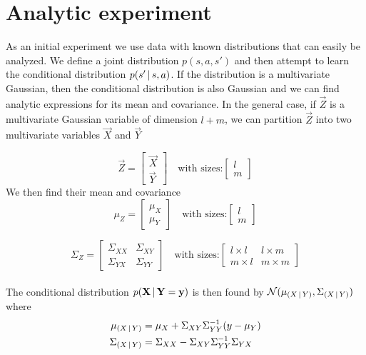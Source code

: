 \section{Analytic experiment}
\label{exp:analytic}
As an initial experiment we use data with known distributions that can easily be analyzed. We define a joint distribution $p(s,a,s')$ and then attempt to learn the conditional distribution $p\given{s'}{s,a}$. If the distribution is a multivariate Gaussian, then the conditional distribution is also Gaussian and we can find analytic expressions for its mean and covariance. In the general case, if $\vec{Z}$ is a multivariate Gaussian variable of dimension $l+m$, we can partition $\vec{Z}$ into two multivariate variables $\vec{X}$ and $\vec{Y}$

\begin{equation}
\vec{Z} = 
\begin{bmatrix}
\vec{X} \\
\vec{Y}
\end{bmatrix}
\quad
\text{with sizes:} 
\begin{bmatrix}
l \\
m
\end{bmatrix}
\end{equation}
We then find their mean and covariance
\begin{equation}
\mu_{Z} = 
\begin{bmatrix}
\mu_{X} \\
\mu_{Y}
\end{bmatrix}
\quad
\text{with sizes:} 
\begin{bmatrix}
l \\
m
\end{bmatrix}
\end{equation}

\begin{equation}
\Sigma_{Z} = 
\begin{bmatrix}
\Sigma_{XX} & \Sigma_{XY} \\
\Sigma_{YX} & \Sigma_{YY}
\end{bmatrix}
\quad
\text{with sizes:} 
\begin{bmatrix}
l\times l & l \times m\\
m \times l & m \times m
\end{bmatrix}
\end{equation}
\\
The conditional distribution $p\given{\mathbf{X}}{\mathbf{Y}=\mathbf{y}}$ is then found by $\mathcal{N} (\mu_{\given{X}{Y}}, \Sigma_{\given{X}{Y}})$ where
\begin{align}
\mu_{\given{X}{Y}} &= \mu_{X} + \Sigma_{XY}\Sigma_{YY}^{-1}(y - \mu_{Y})
\label{eq_cond_mean}
\\
\Sigma_{\given{X}{Y}} &= \Sigma_{XX} - \Sigma_{XY}\Sigma_{YY}^{-1}\Sigma_{YX}
\label{eq_cond_var}
\end{align}

